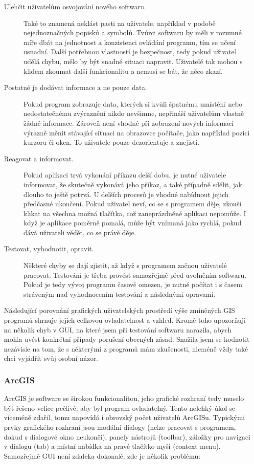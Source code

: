 \documentclass[a4paper,12pt,draft]{article}
\begin{document}
\begin{description}
\item [Ulehčit uživatelům osvojování nového softwaru.] Také to znamená
neklást pasti na uživatele, například v podobě nejednoznačných popisků
a symbolů. Tvůrci softwaru by měli v rozumné míře dbát na jednotnost
a konzistenci ovládání programu, tím se učení usnadní. Další
potřebnou vlastností je bezpečnost, tedy pokud uživatel udělá chybu,
mělo by být snadné situaci napravit. Uživatelé tak mohou s klidem
zkoumat další funkcionalitu a nemusí se bát, že něco zkazí.

\item [Postatné je dodávat informace a ne pouze data.] Pokud program
zobrazuje data, kterých si kvůli špatnému umístění nebo nedostatečnému
zvýraznění nikdo nevšimne, nepřináší uživatelům vlastně žádné
informace. Zároveň není vhodné při zobrazení nových informací výrazně
měnit stávající situaci na obrazovce počítače, jako například pozici
kurzoru či oken. To uživatele pouze dezorientuje a znejistí.

\item [Reagovat a informovat.] Pokud aplikaci trvá vykonání příkazu
delší dobu, je nutné uživatele informovat, že skutečně vykonává
jeho příkaz, a také případně sdělit, jak dlouho to ještě potrvá. U
delších procesů je vhodné nabídnout jejich předčasné ukončení. Pokud
uživatel neví, co se s programem děje, zkouší klikat na všechna možná
tlačítka, což zaneprázdněné aplikaci nepomůže. I když je aplikace
poměrně pomalá, může být vnímaná jako rychlá, pokud dává uživateli
vědět, co se právě děje.

\item [Testovat, vyhodnotit, opravit.] Některé chyby se dají zjistit,
až když s programem začnou uživatelé pracovat. Testování je třeba
provést samozřejmě před uvolněním softwaru. Pokud je tedy vývoj
programu časově omezen, je nutné počítat i s časem stráveným nad
vyhodnocením testování a následnými opravami.
 \end{description}

Následující porovnání grafických uživatelských prostředí
výše zmíněných GIS programů shrnuje jejich celkovou ovladatelnost a
vzhled. Kromě toho upozorňuji na několik chyb v GUI, na které jsem při
testování softwaru narazila, abych mohla uvést konkrétní případy
porušení obecných zásad. Snažila jsem se hodnotit nezávisle na tom,
že s některými z programů mám zkušenosti, nicméně vždy také chci
vyjádřit svůj osobní názor.

\subsubsection{ArcGIS}
ArcGIS je software se širokou funkcionalitou, jeho grafické rozhraní tedy
muselo být řešeno velice pečlivě, aby byl program ovladatelný. Tento
nelehký úkol se víceméně zdařil, tomu napovídá i obrovský počet
uživatelů ArcGISu. Typickými prvky grafického rozhraní jsou modální
dialogy (nelze pracovat s programem, dokud s dialogové okno neukončí),
panely nástrojů (toolbar), záložky pro navigaci v dialogu (tab) a místní
nabídka na pravé tlačítko myši (context menu).
Samozřejmě GUI není zdaleka dokonalé, zde je několik problémů:
\end{document}
